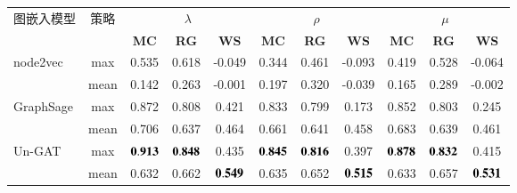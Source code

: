 \begin{table*}[htbp]
    \center
    \vspace{5pt}
    \begin{tabular}{l|c|c|c|c|c|c|c|c|c|c}
    \hline
    \multirow{2}{*}{图嵌入模型}     & \multirow{2}{*}{策略} & \multicolumn{3}{c|}{$\lambda$} & \multicolumn{3}{c|}{$\rho$} & \multicolumn{3}{c}{$\mu$} \\ \cline{3-11} 
     &
       &
      \multicolumn{1}{c|}{\textbf{MC}} &
      \multicolumn{1}{c|}{\textbf{RG}} &
      \multicolumn{1}{c|}{\textbf{WS}} &
      \multicolumn{1}{c|}{\textbf{MC}} &
      \multicolumn{1}{c|}{\textbf{RG}} &
      \multicolumn{1}{c|}{\textbf{WS}} &
      \multicolumn{1}{c|}{\textbf{MC}} &
      \multicolumn{1}{c|}{\textbf{RG}} &
      \multicolumn{1}{c}{\textbf{WS}} \\ \hline
    \multirow{2}{*}{node2vec} &
      max &
      \multicolumn{1}{c|}{0.535} &
      \multicolumn{1}{c|}{0.618} &
      \multicolumn{1}{c|}{-0.049} &
      \multicolumn{1}{c|}{0.344} &
      \multicolumn{1}{c|}{0.461} &
      \multicolumn{1}{c|}{-0.093} &
      \multicolumn{1}{c|}{0.419} &
      \multicolumn{1}{c|}{0.528} &
      \multicolumn{1}{c}{-0.064} \\ \cline{2-11} 
                               & mean & 0.142 & 0.263 & -0.001 & 0.197 & 0.320 & -0.039 & 0.165 & 0.289 & -0.002 \\ \hline
    \multirow{2}{*}{GraphSage} & max  & 0.872 & 0.808 & 0.421 & 0.833 & 0.799 & 0.173 & 0.852 & 0.803 & 0.245 \\ \cline{2-11} 
                               & mean & 0.706 & 0.637 & 0.464 & 0.661 & 0.641 & 0.458 & 0.683  & 0.639 & 0.461 \\ \hline
    \multirow{2}{*}{Un-GAT}       & max  & $\bf 0.913$ & $\bf 0.848$ & 0.435 & $\bf 0.845$ & $\bf 0.816$ & 0.397 & $\bf 0.878$  & $\bf 0.832$ & 0.415 \\ \cline{2-11} 
                               & mean & 0.632 & 0.662 & $\bf 0.549$ & 0.635 & 0.652 & $\bf 0.515$ & 0.633 & 0.657 & $\bf 0.531$ \\ \hline
    \end{tabular}
    \label{table5-5}
\end{table*}


